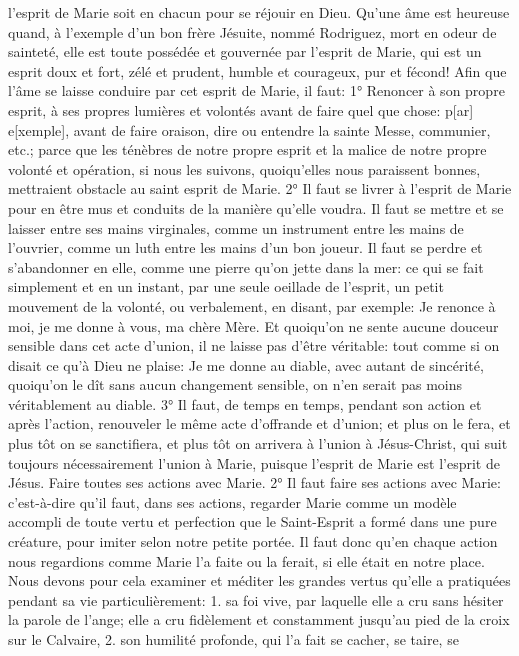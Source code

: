 l'esprit de Marie soit en chacun pour se réjouir en Dieu. Qu'une âme est heureuse quand, à l'exemple d'un bon
frère Jésuite, nommé Rodriguez, mort en odeur de sainteté, elle est toute possédée et gouvernée par l'esprit de
Marie, qui est un esprit doux et fort, zélé et prudent, humble et courageux, pur et fécond!
 Afin que l'âme se laisse conduire par cet esprit de Marie, il faut: 1° Renoncer à son propre esprit, à ses
propres lumières et volontés avant de faire quel que chose: p[ar] e[xemple], avant de faire oraison, dire ou
entendre la sainte Messe, communier, etc.; parce que les ténèbres de notre propre esprit et la malice de notre
propre volonté et opération, si nous les suivons, quoiqu'elles nous paraissent bonnes, mettraient obstacle au saint
esprit de Marie. 2° Il faut se livrer à l'esprit de Marie pour en être mus et conduits de la manière qu'elle voudra. Il
faut se mettre et se laisser entre ses mains virginales, comme un instrument entre les mains de l'ouvrier, comme
un luth entre les mains d'un bon joueur. Il faut se perdre et s'abandonner en elle, comme une pierre qu'on jette
dans la mer: ce qui se fait simplement et en un instant, par une seule oeillade de l'esprit, un petit mouvement de la
volonté, ou verbalement, en disant, par exemple: Je renonce à moi, je me donne à vous, ma chère Mère. Et
quoiqu'on ne sente aucune douceur sensible dans cet acte d'union, il ne laisse pas d'être véritable: tout comme si
on disait ce qu'à Dieu ne plaise: Je me donne au diable, avec autant de sincérité, quoiqu'on le dît sans aucun
changement sensible, on n'en serait pas moins véritablement au diable. 3° Il faut, de temps en temps, pendant son
action et après l'action, renouveler le même acte d'offrande et d'union; et plus on le fera, et plus tôt on se
sanctifiera, et plus tôt on arrivera à l'union à Jésus-Christ, qui suit toujours nécessairement l'union à Marie, puisque
l'esprit de Marie est l'esprit de Jésus.
Faire toutes ses actions avec Marie.
 2° Il faut faire ses actions avec Marie: c'est-à-dire qu'il faut, dans ses actions, regarder Marie comme un
modèle accompli de toute vertu et perfection que le Saint-Esprit a formé dans une pure créature, pour imiter selon
notre petite portée. Il faut donc qu'en chaque action nous regardions comme Marie l'a faite ou la ferait, si elle était
en notre place. Nous devons pour cela examiner et méditer les grandes vertus qu'elle a pratiquées pendant sa vie
particulièrement: 1. sa foi vive, par laquelle elle a cru sans hésiter la parole de l'ange; elle a cru fidèlement et
constamment jusqu'au pied de la croix sur le Calvaire, 2. son humilité profonde, qui l'a fait se cacher, se taire, se
